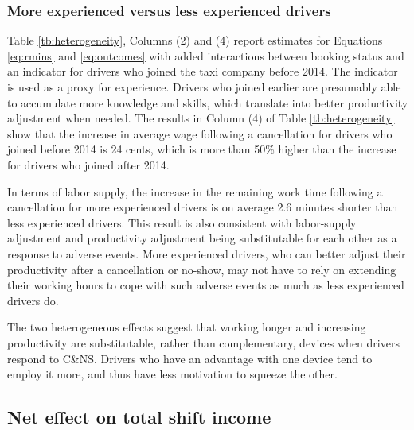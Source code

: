 \documentclass[reviewmode]{restud}
\begin{document}
\subsubsection{More experienced versus less experienced drivers}

Table \ref{tb:heterogeneity}, Columns (2) and (4) report estimates for Equations \eqref{eq:rmins} and \eqref{eq:outcomes} with added interactions between booking status and an indicator for drivers who joined the taxi company before 2014. The indicator is used as a proxy for experience. Drivers who joined earlier are presumably able to accumulate more knowledge and skills, which translate into better productivity adjustment when needed. The results in Column (4) of Table \ref{tb:heterogeneity} show that the increase in average wage following a cancellation for drivers who joined before 2014 is 24 cents, which is more than 50\% higher than the increase for drivers who joined after 2014.

In terms of labor supply, the increase in the remaining work time following a cancellation for more experienced drivers is on average 2.6 minutes shorter than less experienced drivers. This result is also consistent with labor-supply adjustment and productivity adjustment being substitutable for each other as a response to adverse events. More experienced drivers, who can better adjust their productivity after a cancellation or no-show, may not have to rely on extending their working hours to cope with such adverse events as much as less experienced drivers do.


The two heterogeneous effects suggest that working longer and increasing productivity are substitutable, rather than complementary, devices when drivers respond to C\&NS. Drivers who have an advantage with one device tend to employ it more, and thus have less motivation to squeeze the other.



\subsection{Net effect on total shift income}
\end{document}
